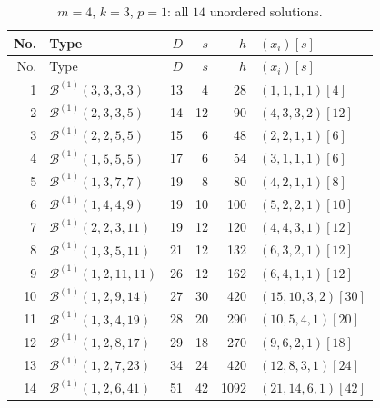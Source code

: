 \documentclass[11pt,a4paper]{article}
\newcommand{\Ber}{\mathcal B}
\theoremstyle{definition}
\theoremstyle{plain}
\begin{document}
\begin{longtable}{@{}r l r r r l@{}}
\caption{$m=4$, $k=3$, $p=1$: all $14$ unordered solutions.}\label{tab:m4p1}\\
\toprule
No. & Type & $D$ & $s$ & $h$ & $(x_i)[s]$\\
\midrule
\endfirsthead
\toprule
No. & Type & $D$ & $s$ & $h$ & $(x_i)[s]$\\
\midrule
\endhead
1 & $\Ber^{(1)}(3,3,3,3)$ & 13 & 4 & 28 & $(1,1,1,1)[4]$ \\
2 & $\Ber^{(1)}(2,3,3,5)$ & 14 & 12 & 90 & $(4,3,3,2)[12]$ \\
3 & $\Ber^{(1)}(2,2,5,5)$ & 15 & 6 & 48 & $(2,2,1,1)[6]$ \\
4 & $\Ber^{(1)}(1,5,5,5)$ & 17 & 6 & 54 & $(3,1,1,1)[6]$ \\
5 & $\Ber^{(1)}(1,3,7,7)$ & 19 & 8 & 80 & $(4,2,1,1)[8]$ \\
6 & $\Ber^{(1)}(1,4,4,9)$ & 19 & 10 & 100 & $(5,2,2,1)[10]$ \\
7 & $\Ber^{(1)}(2,2,3,11)$ & 19 & 12 & 120 & $(4,4,3,1)[12]$ \\
8 & $\Ber^{(1)}(1,3,5,11)$ & 21 & 12 & 132 & $(6,3,2,1)[12]$ \\
9 & $\Ber^{(1)}(1,2,11,11)$ & 26 & 12 & 162 & $(6,4,1,1)[12]$ \\
10 & $\Ber^{(1)}(1,2,9,14)$ & 27 & 30 & 420 & $(15,10,3,2)[30]$ \\
11 & $\Ber^{(1)}(1,3,4,19)$ & 28 & 20 & 290 & $(10,5,4,1)[20]$ \\
12 & $\Ber^{(1)}(1,2,8,17)$ & 29 & 18 & 270 & $(9,6,2,1)[18]$ \\
13 & $\Ber^{(1)}(1,2,7,23)$ & 34 & 24 & 420 & $(12,8,3,1)[24]$ \\
14 & $\Ber^{(1)}(1,2,6,41)$ & 51 & 42 & 1092 & $(21,14,6,1)[42]$ \\
\bottomrule
\end{longtable}
\end{document}
